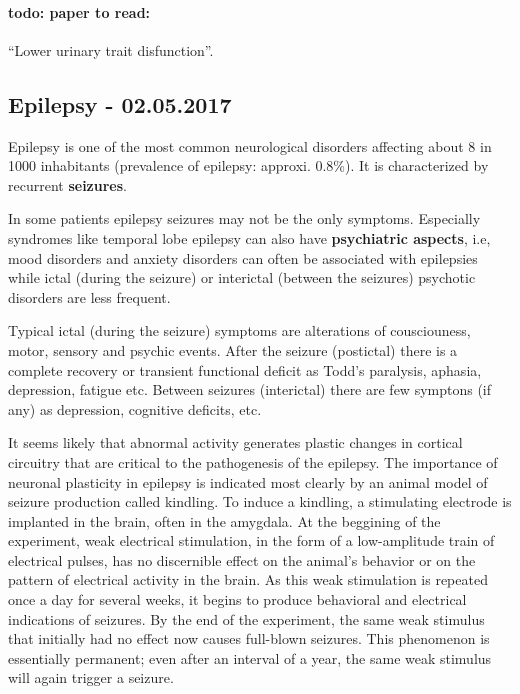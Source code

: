\documentclass[12pt,article,oneside,a4paper]{memoir}
\begin{document}
 
\paragraph{todo: paper to read:} ``Lower urinary trait disfunction''.

\newpage
\subsection{Epilepsy - 02.05.2017}
Epilepsy is one of the most common neurological disorders affecting about 8 in 1000 inhabitants (prevalence of epilepsy: approxi. 0.8\%). It is characterized by recurrent \textbf{seizures}.

In some patients epilepsy seizures may not be the only symptoms. Especially syndromes like temporal lobe epilepsy can also have \textbf{psychiatric aspects}, i.e, mood disorders and anxiety disorders can often be associated with epilepsies while ictal (during the seizure) or interictal (between the seizures) psychotic disorders are less frequent.

Typical ictal (during the seizure) symptoms are alterations of cousciouness, motor, sensory and psychic events. After the seizure (postictal) there is a complete recovery or transient functional deficit as Todd's paralysis, aphasia, depression, fatigue etc. Between seizures (interictal) there are few symptons (if any) as depression, cognitive deficits, etc.

It seems likely that abnormal activity generates plastic changes in cortical circuitry that are critical to the pathogenesis of the epilepsy. The importance of neuronal plasticity in epilepsy is indicated most clearly by an animal model of seizure production called kindling. To induce a kindling, a stimulating electrode is implanted in the brain, often in the amygdala. At the beggining of the experiment, weak electrical stimulation, in the form of a low-amplitude train of electrical pulses, has no discernible effect on the animal’s behavior or on the pattern of electrical activity in the brain. As this weak stimulation is repeated once a day for several weeks, it begins to produce behavioral and electrical indications of seizures. By the end of the experiment, the same weak stimulus that initially had no effect now causes full-blown seizures. This phenomenon is essentially permanent; even after an interval of a year, the same weak stimulus will again trigger a seizure. 
\end{document}
